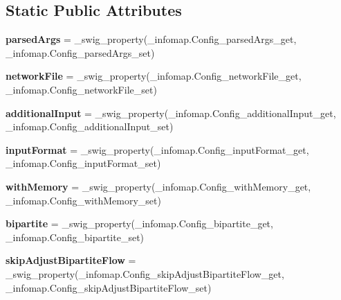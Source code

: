\subsection*{Static Public Attributes}
\begin{DoxyCompactItemize}
\item 
\mbox{\label{classinfomap_1_1Config_a28adb55581431c02839859c0262ba2d8}} 
{\bfseries parsed\+Args} = \+\_\+swig\+\_\+property(\+\_\+infomap.\+Config\+\_\+parsed\+Args\+\_\+get, \+\_\+infomap.\+Config\+\_\+parsed\+Args\+\_\+set)
\item 
\mbox{\label{classinfomap_1_1Config_ad7b546b454eb679cfebef66b7a160fe1}} 
{\bfseries network\+File} = \+\_\+swig\+\_\+property(\+\_\+infomap.\+Config\+\_\+network\+File\+\_\+get, \+\_\+infomap.\+Config\+\_\+network\+File\+\_\+set)
\item 
\mbox{\label{classinfomap_1_1Config_a13f36ce7bcb0733e70f2a776b080f7da}} 
{\bfseries additional\+Input} = \+\_\+swig\+\_\+property(\+\_\+infomap.\+Config\+\_\+additional\+Input\+\_\+get, \+\_\+infomap.\+Config\+\_\+additional\+Input\+\_\+set)
\item 
\mbox{\label{classinfomap_1_1Config_a7f5f459e60c3d41261b317a61d351357}} 
{\bfseries input\+Format} = \+\_\+swig\+\_\+property(\+\_\+infomap.\+Config\+\_\+input\+Format\+\_\+get, \+\_\+infomap.\+Config\+\_\+input\+Format\+\_\+set)
\item 
\mbox{\label{classinfomap_1_1Config_aff85ceea4501a826e3d27a8f13891b7f}} 
{\bfseries with\+Memory} = \+\_\+swig\+\_\+property(\+\_\+infomap.\+Config\+\_\+with\+Memory\+\_\+get, \+\_\+infomap.\+Config\+\_\+with\+Memory\+\_\+set)
\item 
\mbox{\label{classinfomap_1_1Config_a24f80c82b1af7bb340ce231ea82b6379}} 
{\bfseries bipartite} = \+\_\+swig\+\_\+property(\+\_\+infomap.\+Config\+\_\+bipartite\+\_\+get, \+\_\+infomap.\+Config\+\_\+bipartite\+\_\+set)
\item 
\mbox{\label{classinfomap_1_1Config_a5907fade60626ce850663b66520668a7}} 
{\bfseries skip\+Adjust\+Bipartite\+Flow} = \+\_\+swig\+\_\+property(\+\_\+infomap.\+Config\+\_\+skip\+Adjust\+Bipartite\+Flow\+\_\+get, \+\_\+infomap.\+Config\+\_\+skip\+Adjust\+Bipartite\+Flow\+\_\+set)

\end{DoxyCompactItemize}

